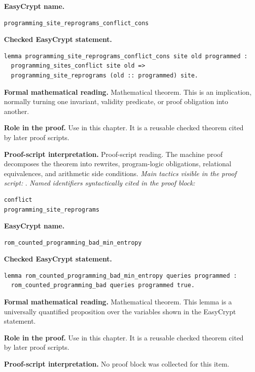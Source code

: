 \begin{formaltheorem}
\noindent\textbf{EasyCrypt name.}
\begin{lstlisting}[language=EasyCrypt,basicstyle=\ttfamily\scriptsize]
programming_site_reprograms_conflict_cons
\end{lstlisting}
\noindent\textbf{Checked EasyCrypt statement.}
\begin{lstlisting}[language=EasyCrypt,basicstyle=\ttfamily\scriptsize]
lemma programming_site_reprograms_conflict_cons site old programmed :
  programming_sites_conflict site old =>
  programming_site_reprograms (old :: programmed) site.
\end{lstlisting}
\noindent\textbf{Formal mathematical reading.}
Mathematical theorem. This is an implication, normally turning one invariant, validity predicate, or proof obligation into another.

\noindent\textbf{Role in the proof.}
Use in this chapter. It is a reusable checked theorem cited by later proof scripts.

\noindent\textbf{Proof-script interpretation.}
Proof-script reading. The machine proof decomposes the theorem into rewrites, program-logic obligations, relational equivalences, and arithmetic side conditions.
\emph{Main tactics visible in the proof script:} .
\emph{Named identifiers syntactically cited in the proof block:}
\begin{lstlisting}[language=EasyCrypt,basicstyle=\ttfamily\scriptsize]
conflict
programming_site_reprograms
\end{lstlisting}

\end{formaltheorem}

\begin{formaltheorem}
\noindent\textbf{EasyCrypt name.}
\begin{lstlisting}[language=EasyCrypt,basicstyle=\ttfamily\scriptsize]
rom_counted_programming_bad_min_entropy
\end{lstlisting}
\noindent\textbf{Checked EasyCrypt statement.}
\begin{lstlisting}[language=EasyCrypt,basicstyle=\ttfamily\scriptsize]
lemma rom_counted_programming_bad_min_entropy queries programmed :
  rom_counted_programming_bad queries programmed true.
\end{lstlisting}
\noindent\textbf{Formal mathematical reading.}
Mathematical theorem. This lemma is a universally quantified proposition over the variables shown in the EasyCrypt statement.

\noindent\textbf{Role in the proof.}
Use in this chapter. It is a reusable checked theorem cited by later proof scripts.

\noindent\textbf{Proof-script interpretation.}
No proof block was collected for this item.

\end{formaltheorem}

